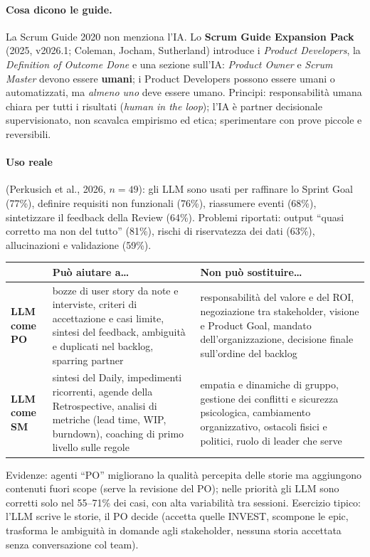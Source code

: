 \documentclass[a4paper,12pt]{article}
\begin{document}
\paragraph{Cosa dicono le guide.} La Scrum Guide 2020 non menziona l'IA. Lo \textbf{Scrum
Guide Expansion Pack} (2025, v2026.1; Coleman, Jocham, Sutherland) introduce i
\emph{Product Developers}, la \emph{Definition of Outcome Done} e una sezione sull'IA:
\emph{Product Owner} e \emph{Scrum Master} devono essere \textbf{umani}; i Product Developers
possono essere umani o automatizzati, ma \emph{almeno uno} deve essere umano. Principi:
responsabilità umana chiara per tutti i risultati (\emph{human in the loop}); l'IA è partner
decisionale supervisionato, non scavalca empirismo ed etica; sperimentare con prove piccole e
reversibili.

\paragraph{Uso reale} (Perkusich et al., 2026, $n=49$): gli LLM sono usati per raffinare lo
Sprint Goal (77\%), definire requisiti non funzionali (76\%), riassumere eventi (68\%),
sintetizzare il feedback della Review (64\%). Problemi riportati: output ``quasi corretto ma
non del tutto'' (81\%), rischi di riservatezza dei dati (63\%), allucinazioni e validazione
(59\%).

\begin{center}
\begin{tabular}{|p{2.6cm}|p{6.2cm}|p{6.2cm}|}
\hline
 & \textbf{Può aiutare a\dots} & \textbf{Non può sostituire\dots}\\
\hline
\textbf{LLM come PO} & bozze di user story da note e interviste, criteri di accettazione e casi limite, sintesi del feedback, ambiguità e duplicati nel backlog, sparring partner & responsabilità del valore e del ROI, negoziazione tra stakeholder, visione e Product Goal, mandato dell'organizzazione, decisione finale sull'ordine del backlog\\
\hline
\textbf{LLM come SM} & sintesi del Daily, impedimenti ricorrenti, agende della Retrospective, analisi di metriche (lead time, WIP, burndown), coaching di primo livello sulle regole & empatia e dinamiche di gruppo, gestione dei conflitti e sicurezza psicologica, cambiamento organizzativo, ostacoli fisici e politici, ruolo di leader che serve\\
\hline
\end{tabular}
\end{center}
Evidenze: agenti ``PO'' migliorano la qualità percepita delle storie ma aggiungono
contenuti fuori scope (serve la revisione del PO); nelle priorità gli LLM sono corretti solo
nel 55--71\% dei casi, con alta variabilità tra sessioni. Esercizio tipico: l'LLM scrive le
storie, il PO decide (accetta quelle INVEST, scompone le epic, trasforma le ambiguità in
domande agli stakeholder, nessuna storia accettata senza conversazione col team).
\end{document}
